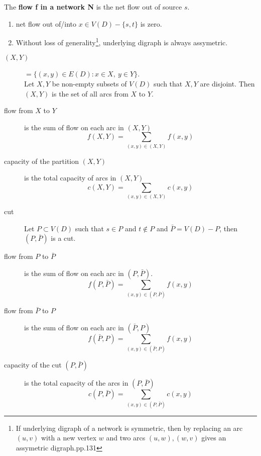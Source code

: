 \begin{definition}
	The \textbf{flow f in a network N} is the net flow out of source $s$.
\end{definition}

\begin{remark}
	\begin{enumerate}
		\item net flow out of/into $x \in V(D)-\{s,t\}$ is zero.
		\item Without loss of generality\footnote{If underlying digraph of a network is symmetric, then by replacing an arc $(u,v)$ with a new vertex $w$ and two arcs $(u,w),(w,v)$ gives an assymetric digraph.\cite{chartrand}pp.131}, underlying digraph is always assymetric.
	\end{enumerate}
\end{remark}

\begin{description}
	\item[$(X,Y)$] $=\{ (x,y) \in E(D) : x \in X,\ y \in Y \}$.\\
		Let $X,Y$ be non-empty subsets of $V(D)$ such that $X,Y$ are disjoint.
		Then $(X,Y)$ is the set of all arcs from $X$ to $Y$.
	\item[flow from $X$ to $Y$] is the sum of flow on each arc in $(X,Y)$
		\begin{equation}
		f(X,Y) = \sum_{(x,y) \in (X,Y)} f(x,y)
		\end{equation}
	\item[capacity of the partition $(X,Y)$] is the total capacity of arcs in $(X,Y)$
		\begin{equation}
		c(X,Y) = \sum_{(x,y) \in (X,Y)} c(x,y)
		\end{equation}
	\item[cut] Let $P \subset V(D)$ such that $s \in P$ and $t \not\in P$ and $\bar{P} = V(D)-P$, then $(P,\bar{P})$ is a cut.
	\item[flow from $P$ to $\bar{P}$] is the sum of flow on each arc in $(P,\bar{P})$.
		\begin{equation}
		f(P,\bar{P}) = \sum_{(x,y) \in (P,\bar{P})} f(x,y)
		\end{equation}
	\item[flow from $\bar{P}$ to $P$] is the sum of flow on each arc in $(\bar{P},P)$
		\begin{equation}
		f(\bar{P},P) = \sum_{(x,y) \in (\bar{P},P)} f(x,y)
		\end{equation}
	\item[capacity of the cut $(P,\bar{P})$] is the total capacity of the arcs in $(P,\bar{P})$
		\begin{equation}
		c(P,\bar{P}) = \sum_{(x,y) \in (P,\bar{P})} c(x,y)
		\end{equation}
\end{description}

